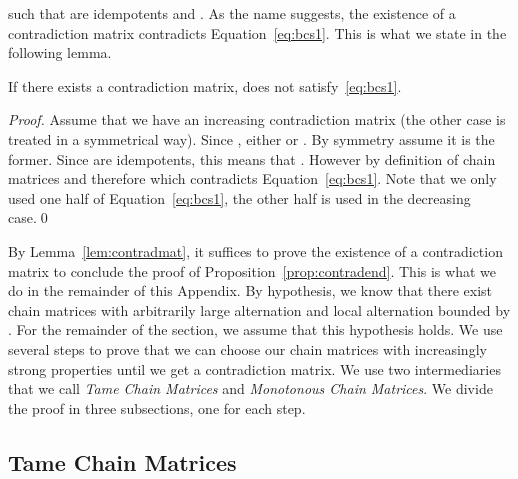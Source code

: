 \documentclass[envcountsame]{llncs}
\newcommand\chain{chain\xspace}
\newcommand\Chain{Chain\xspace}
\begin{document}
\begin{center}
\end{center}

\noindent
such that  are idempotents and . As the
name suggests, the existence of a contradiction matrix contradicts
Equation~\eqref{eq:bcs1}. This is what we state in the following
lemma.

\begin{lemma} \label{lem:contradmat}
  If there exists a contradiction matrix,  does not
  satisfy~\eqref{eq:bcs1}.
\end{lemma}

\begin{proof}
  Assume that we have an increasing contradiction matrix (the other case
  is treated in a symmetrical way). Since , either
   or . By symmetry assume it is the
  former. Since  are idempotents, this means that . However by definition of \chain
  matrices  and therefore   which contradicts Equation~\eqref{eq:bcs1}. Note 
  that we only used one half of Equation~\eqref{eq:bcs1}, the other half 
  is used in the decreasing case.\qed
\end{proof}

By Lemma~\ref{lem:contradmat}, it suffices to prove the existence of a
contradiction matrix to conclude the proof of
Proposition~\ref{prop:contradend}. This is what we do in the remainder
of this Appendix. By hypothesis, we know that there exist \chain
matrices with arbitrarily large alternation and local alternation
bounded by . For the remainder of the section, we assume
that this hypothesis holds. We use several steps to prove that we can
choose our \chain matrices with increasingly strong properties until
we get a contradiction matrix. We use two intermediaries that we 
call \emph{Tame \Chain Matrices} and \emph{Monotonous \Chain
  Matrices}. We divide the proof in three subsections, one for each
step.

\subsection{Tame \Chain Matrices}
\end{document}

